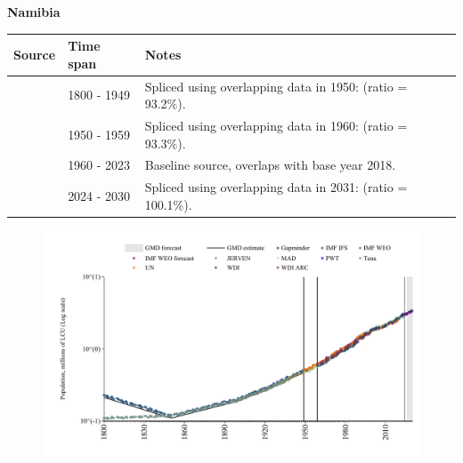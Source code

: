 \documentclass[12pt,a4paper,landscape]{article}
\begin{document}
\begin{adjustbox}{max totalsize={\paperwidth}{\paperheight},center}
\begin{minipage}[t][\textheight][t]{\textwidth}
\vspace*{0.5cm}
{}
\begin{center}
{\Large\bfseries Namibia}
\end{center}
\vspace{0.5cm}
\begin{table}[H]
\centering
\small
\begin{tabular}{|l|l|l|}
\hline
\textbf{Source} & \textbf{Time span} & \textbf{Notes} \\
\hline
\rowcolor{white}\cite{Gapminder}& 1800 - 1949 &Spliced using overlapping data in 1950: (ratio = 93.2\%).\\
\rowcolor{lightgray}\cite{IMF_IFS}& 1950 - 1959 &Spliced using overlapping data in 1960: (ratio = 93.3\%).\\
\rowcolor{white}\cite{WDI}& 1960 - 2023 &Baseline source, overlaps with base year 2018.\\
\rowcolor{lightgray}\cite{Gapminder}& 2024 - 2030 &Spliced using overlapping data in 2031: (ratio = 100.1\%).\\
\hline
\end{tabular}
\end{table}
\begin{figure}[H]
\centering
\includegraphics[width=\textwidth,height=0.6\textheight,keepaspectratio]{graphs/NAM_pop.pdf}
\end{figure}
\end{minipage}
\end{adjustbox}
\end{document}
